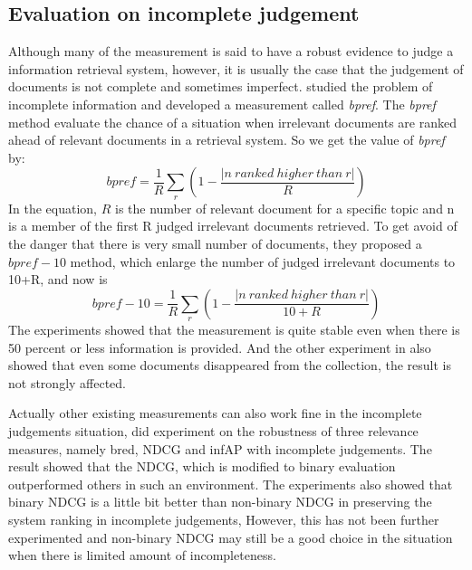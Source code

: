 \subsection{Evaluation on incomplete judgement}
Although many of the measurement is said to have a robust evidence to judge a information retrieval system, however, it is usually the case that the judgement of documents is not complete and sometimes imperfect. \cite{Buckley2004} studied the problem of incomplete information and developed a measurement called \textit{bpref}. The \textit{bpref} method evaluate the chance of a situation when irrelevant documents are ranked ahead of relevant documents in a retrieval system. So we get the value of \textit{bpref} by:
\begin{equation}
bpref=\frac{1}{R}\sum\limits_r(1-\frac{|n\ ranked\ higher\ than\ r|}{R})
\end{equation}
In the equation, $R$ is the number of relevant document for a specific topic and n is a member of the first R judged irrelevant documents retrieved. To get avoid of the danger that there is very small number of documents, they proposed a $bpref-10$ method, which enlarge the number of judged irrelevant documents to 10+R, and now is 
\begin{equation}
bpref-10=\frac{1}{R}\sum\limits_r(1-\frac{|n\ ranked\ higher\ than\ r|}{10+R})
\end{equation}
The experiments showed that the measurement is quite stable even when there is 50 percent or less information is provided. And the other experiment in \cite{Buckley2004} also showed that even some documents disappeared from the collection, the result is not strongly affected.

Actually other existing measurements can also work fine in the incomplete judgements situation, \cite{Bompada2007} did experiment on the robustness of three relevance measures, namely bred, NDCG and infAP with incomplete judgements. The result showed that the NDCG, which is modified to binary evaluation outperformed others in such an environment. The experiments also showed that binary NDCG is a little bit better than non-binary NDCG in preserving the system ranking in incomplete judgements, However, this has not been further experimented and non-binary NDCG may still be a good choice in the situation when there is limited amount of incompleteness.   





